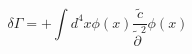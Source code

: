 \begin{equation}
\delta\Gamma =  + \int d^4x \phi(x)\frac{\tilde c}{\tilde\partial^2}\phi(x)
\end{equation}

